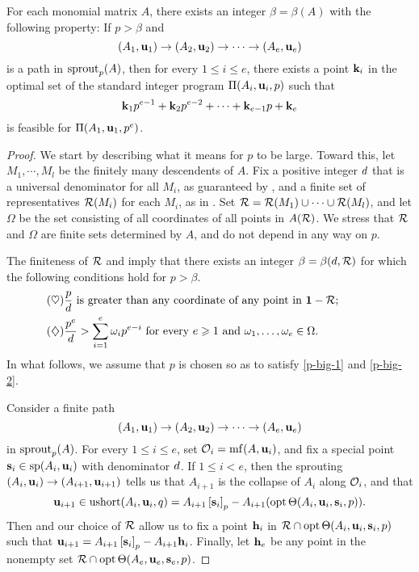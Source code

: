 \documentclass{amsart}
\begin{document}
\begin{theorem}
\label{ILL: T}
   For each monomial matrix $A$, there exists an integer $\beta = \beta(A)$ with the following property\textup:
   If $p>\beta$ and \[ (A_1, \mathbf{u}_1) \to (A_2, \mathbf{u}_2) \to \cdots \to (A_e, \mathbf{u}_e)\] is a path in $\operatorname{sprout}_p(A)$, then for every $1 \leq i \leq e$, there exists a point $\mathbf{k}_i$ in the optimal set of the standard integer program $\Pi(A_i, \mathbf{u}_i,p)$  such that
   \[
      \mathbf{k}_1 p^{e-1} + \mathbf{k}_2 p^{e-2} + \cdots + \mathbf{k}_{e-1} p + \mathbf{k}_e
   \]
   is feasible for $\Pi(A_1, \mathbf{u}_1, p^e)$.
 \end{theorem}

\begin{proof}
   We start by describing what it means for $p$ to be large.
   Toward this, let $M_1, \cdots, M_l$ be the finitely many descendents of  $A$.
   Fix a positive integer $d$ that is a universal denominator for all $M_i$, as guaranteed by , and a finite set of representatives $\mathcal{R}(M_i)$ for each $M_i$, as in .
   Set $\mathcal{R} = \mathcal{R}(M_1) \cup \cdots \cup \mathcal{R}(M_l)$, and let $\Omega$ be the set consisting of all coordinates of all points in $A(\mathcal{R})$.
   We stress that $\mathcal{R}$ and $\Omega$ are finite sets determined by $A$, and do not depend in any way on $p$.

   The finiteness of $\mathcal{R}$  and 
   imply that there exists an integer $\beta = \beta(d, \mathcal{R})$ for which the following conditions hold for $p > \beta$.
    \begin{align}
      \tag{$\heartsuit$} \label{p-big-1}
      &\text{$\frac{p}{d}$ is greater than any coordinate of any point in $\mathbf{1} - \mathcal{R}$;}\qquad\qquad\quad \\
      \tag{$\diamondsuit$} \label{p-big-2}
      &\text{$\frac{p^e}{d} > \sum_{i=1}^e \omega_i p^{e-i}$ for every $e \geqslant 1$ and $\omega_1, \ldots, \omega_e \in \Omega$.}
    \end{align}
    In what follows, we assume that $p$ is chosen so as to satisfy \eqref{p-big-1} and \eqref{p-big-2}.

    Consider a finite path
    \[ (A_1, \mathbf{u}_1) \to (A_2, \mathbf{u}_2) \to \cdots \to (A_e, \mathbf{u}_e) \]
    in $\operatorname{sprout}_p(A)$.
    For every $1 \leq i \leq e$, set $\mathcal{O}_i = \operatorname{mf}(A, \mathbf{u}_i)$, and fix a special point $\mathbf{s}_i \in \operatorname{sp}(A_i, \mathbf{u}_i)$ with denominator $d$.
    If $1 \leq i < e$, then the sprouting $(A_i, \mathbf{u}_i) \to (A_{i+1}, \mathbf{u}_{i+1})$ tells us that $A_{i+1}$ is the collapse of $A_i$ along $\mathcal{O}_i$, and that
    \[
       \mathbf{u}_{i+1} \in \operatorname{ushort}(A_i, \mathbf{u}_i, q)= A_{i+1} \left[ \mathbf{s}_i \right]_p - A_{i+1}(\operatorname{opt} \Theta( A_i, \mathbf{u}_i, \mathbf{s}_i, p)).
    \]
    Then  and our choice of $\mathcal{R}$ allow us to fix a point $\mathbf{h}_i$ in $\mathcal{R} \cap \operatorname{opt} \Theta ( A_i, \mathbf{u}_i, \mathbf{s}_i, p)$ such that $\mathbf{u}_{i+1} = A_{i+1} \left[ \mathbf{s}_i \right]_p - A_{i+1} \mathbf{h}_i$.
    Finally, let $\mathbf{h}_e$ be any point in the nonempty set $\mathcal{R} \cap \operatorname{opt} \Theta ( A_e, \mathbf{u}_e, \mathbf{s}_e, p)$.


\end{proof}
\end{document}
